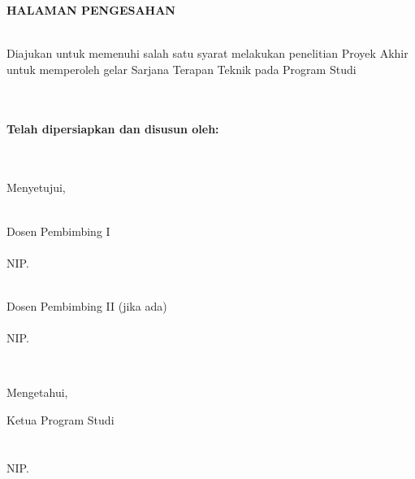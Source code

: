 \newpage
\begin{center}
    \begin{doublespace}
        \textbf{\large \MakeUppercase{HALAMAN PENGESAHAN}} \\ [0.5cm]
        \textbf{\normalsize \MakeUppercase{{\tipe} \\ {\judul}}}
    \end{doublespace}
\end{center}

\begin{center}
    Diajukan untuk memenuhi salah satu syarat melakukan penelitian Proyek Akhir untuk memperoleh gelar Sarjana Terapan Teknik pada Program Studi \\ {\prodi} {\departemen} \\ {\fakultas} {\universitas} \\[1cm]
\end{center}

\begin{center}
    \textbf{Telah dipersiapkan dan disusun oleh:} \\ [0.5cm]
    \textbf{\MakeUppercase{\underline{\penulisPertama}}} \\
    \textbf{\MakeUppercase{{\nimPertama}}} \\[1cm]
\end{center}

\begin{center}
    Menyetujui, \\[1cm]
\end{center}

\begin{minipage}{0.48\textwidth}
    \hfill\\[0.25cm]
    Dosen Pembimbing I \\[2cm]
    \underline{\dosenPembimbingI}\\
    NIP. {\nipDosenPembimbingI}
\end{minipage}
\hfill
\begin{minipage}{0.39\textwidth}
    \hfill\\[0.25cm]
    Dosen Pembimbing II (jika ada)\\[2cm]
    \underline{\dosenPembimbingII}\\
    NIP. {\nipDosenPembimbingI}
\end{minipage}%
\\[1cm]

\begin{center}
    Mengetahui, \\[1cm]
\end{center}

\begin{center}
    Ketua Program Studi \\ {\prodi} \\[2cm]
    \underline{\ketuaProgramStudi}\\
    NIP. {\nipKetuaProgramStudi} \\[3cm]
\end{center}


